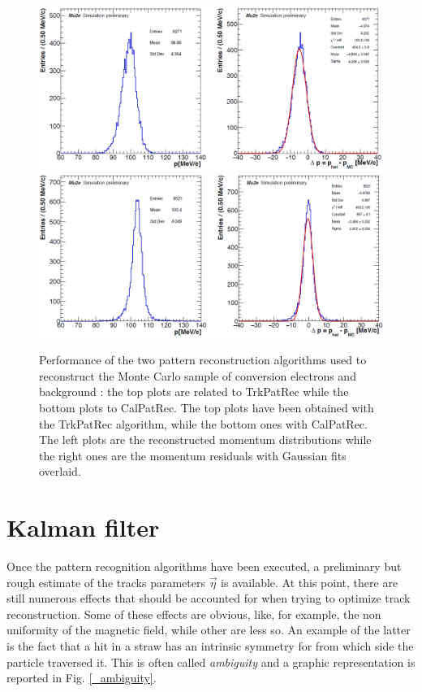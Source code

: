 \documentclass[12pt,a4paper,openright, oneside, titlepage]{book} %
\begin{document}
\begin{figure}[h!]
\centering
\includegraphics[scale=0.6]{giani_TrkPatRec_performance}
\includegraphics[scale=0.6]{giani_CalPatRec_performance}
\caption[Confront of two pattern recognition algorithms]{Performance of the two pattern reconstruction algorithms used to reconstruct 
the Monte Carlo sample of conversion electrons and background \cite{GianiPatRec:2020}: 
the top plots are related to TrkPatRec while the bottom plots to CalPatRec. 
The top plots have been obtained with the TrkPatRec algorithm,
while the bottom ones with CalPatRec. 
The left plots are the reconstructed momentum distributions 
while the right ones are the momentum residuals
with Gaussian fits overlaid.}
\label{_PatRec_performance}
\end{figure}

\section{Kalman filter}
Once the pattern recognition algorithms have been executed, a preliminary but rough estimate of the tracks parameters $\vec{\eta}$ is available. 
At this point, there are still numerous effects that should be accounted for 
when trying to optimize track reconstruction. 
Some of these effects are obvious, 
like, for example, the non uniformity of the magnetic field, 
while other are less so. 
An example of the latter is the fact that a hit in a straw has 
an intrinsic symmetry for from which side the particle traversed it. 
This is often called \textit{ambiguity} and a graphic representation is reported in Fig. \ref{_ambiguity}.\\
\end{document}
